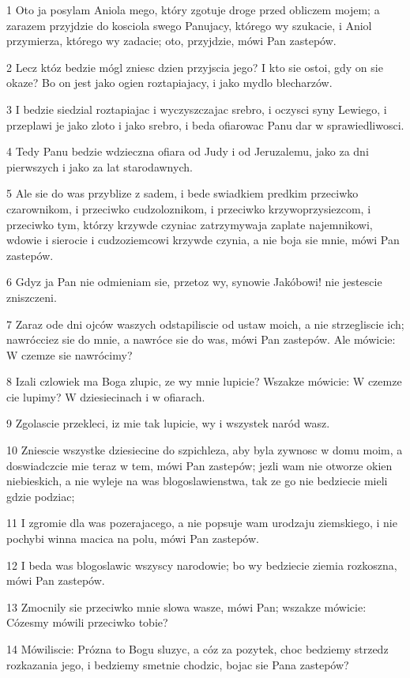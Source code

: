 \par 1 Oto ja posylam Aniola mego, który zgotuje droge przed obliczem mojem; a zarazem przyjdzie do kosciola swego Panujacy, którego wy szukacie, i Aniol przymierza, którego wy zadacie; oto, przyjdzie, mówi Pan zastepów.
\par 2 Lecz któz bedzie mógl zniesc dzien przyjscia jego? I kto sie ostoi, gdy on sie okaze? Bo on jest jako ogien roztapiajacy, i jako mydlo blecharzów.
\par 3 I bedzie siedzial roztapiajac i wyczyszczajac srebro, i oczysci syny Lewiego, i przeplawi je jako zloto i jako srebro, i beda ofiarowac Panu dar w sprawiedliwosci.
\par 4 Tedy Panu bedzie wdzieczna ofiara od Judy i od Jeruzalemu, jako za dni pierwszych i jako za lat starodawnych.
\par 5 Ale sie do was przyblize z sadem, i bede swiadkiem predkim przeciwko czarownikom, i przeciwko cudzoloznikom, i przeciwko krzywoprzysiezcom, i przeciwko tym, którzy krzywde czyniac zatrzymywaja zaplate najemnikowi, wdowie i sierocie i cudzoziemcowi krzywde czynia, a nie boja sie mnie, mówi Pan zastepów.
\par 6 Gdyz ja Pan nie odmieniam sie, przetoz wy, synowie Jakóbowi! nie jestescie zniszczeni.
\par 7 Zaraz ode dni ojców waszych odstapiliscie od ustaw moich, a nie strzegliscie ich; nawrócciez sie do mnie, a nawróce sie do was, mówi Pan zastepów. Ale mówicie: W czemze sie nawrócimy?
\par 8 Izali czlowiek ma Boga zlupic, ze wy mnie lupicie? Wszakze mówicie: W czemze cie lupimy? W dziesiecinach i w ofiarach.
\par 9 Zgolascie przekleci, iz mie tak lupicie, wy i wszystek naród wasz.
\par 10 Zniescie wszystke dziesiecine do szpichleza, aby byla zywnosc w domu moim, a doswiadczcie mie teraz w tem, mówi Pan zastepów; jezli wam nie otworze okien niebieskich, a nie wyleje na was blogoslawienstwa, tak ze go nie bedziecie mieli gdzie podziac;
\par 11 I zgromie dla was pozerajacego, a nie popsuje wam urodzaju ziemskiego, i nie pochybi winna macica na polu, mówi Pan zastepów.
\par 12 I beda was blogoslawic wszyscy narodowie; bo wy bedziecie ziemia rozkoszna, mówi Pan zastepów.
\par 13 Zmocnily sie przeciwko mnie slowa wasze, mówi Pan; wszakze mówicie: Cózesmy mówili przeciwko tobie?
\par 14 Mówiliscie: Prózna to Bogu sluzyc, a cóz za pozytek, choc bedziemy strzedz rozkazania jego, i bedziemy smetnie chodzic, bojac sie Pana zastepów?
